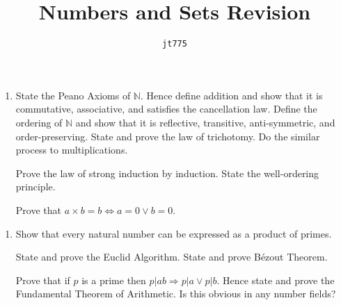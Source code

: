 \documentclass[11pt]{article}
\title{\textbf{Numbers and Sets Revision}}
\author{\texttt{jt775}}
\date{\null}
\newlength{\qspace}
\newcounter{qnumber}
\newenvironment{question}%
 {\vspace{\qspace}
  \begin{enumerate}[\bfseries 1\quad][10]%
    \setcounter{enumi}{\value{qnumber}}%
    \item%
 }
{
  \end{enumerate}
  \filbreak
  \stepcounter{qnumber}
 }
\begin{document}
\maketitle
\vspace{-1.5cm}
\begin{question}
    State the Peano Axioms of $ \mathbb{N} $. Hence define addition and show that it is commutative, associative, and satisfies the cancellation law. Define the ordering of $ \mathbb{N} $ and show that it is reflective, transitive, anti-symmetric, and order-preserving. State and prove the law of trichotomy. Do the similar process to multiplications.

    Prove the law of strong induction by induction. State the well-ordering principle.

    Prove that $ a\times b=b \Leftrightarrow a=0 \lor b=0 $.
\end{question}
\begin{question}
  Show that every natural number can be expressed as a product of primes. 
  
  State and prove the Euclid Algorithm. State and prove B\'{e}zout Theorem.

  Prove that if $p$ is a prime then $ p|ab \Rightarrow p|a \lor p|b $. Hence state and prove the Fundamental Theorem of Arithmetic. Is this obvious in any number fields?
\end{question}
\end{document}
